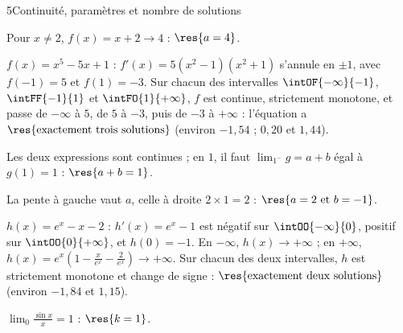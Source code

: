 \begin{corrige}{5}{Continuité, paramètres et nombre de solutions}
\begin{questions}
  \item Pour $x\neq2$, $f(x)=x+2\to4$ : $\res{a=4}$.
  \item $f(x)=x^{5}-5x+1$ : $f'(x)=5\left(x^{2}-1\right)\left(x^{2}+1\right)$ s'annule en $\pm1$, avec $f(-1)=5$ et $f(1)=-3$.
    Sur chacun des intervalles $\intOF{-\infty}{-1}$, $\intFF{-1}{1}$ et $\intFO{1}{+\infty}$, $f$ est continue, strictement
    monotone, et passe de $-\infty$ à $5$, de $5$ à $-3$, puis de $-3$ à $+\infty$ : l'équation a $\res{\text{exactement trois solutions}}$
    (environ $-1{,}54$ ; $0{,}20$ et $1{,}44$).
  \item \begin{questions}
      \item Les deux expressions sont continues ; en $1$, il faut $\lim_{1^{-}}g=a+b$ égal à $g(1)=1$ : $\res{a+b=1}$.
      \item La pente à gauche vaut $a$, celle à droite $2\times1=2$ : $\res{a=2\text{ et }b=-1}$.
    \end{questions}
  \item $h(x)=e^{x}-x-2$ : $h'(x)=e^{x}-1$ est négatif sur $\intOO{-\infty}{0}$, positif sur $\intOO{0}{+\infty}$, et
    $h(0)=-1$. En $-\infty$, $h(x)\to+\infty$ ; en $+\infty$, $h(x)=e^{x}\left(1-\frac{x}{e^{x}}-\frac{2}{e^{x}}\right)\to+\infty$.
    Sur chacun des deux intervalles, $h$ est strictement monotone et change de signe : $\res{\text{exactement deux solutions}}$
    (environ $-1{,}84$ et $1{,}15$).
  \item $\lim_{0}\frac{\sin x}{x}=1$ : $\res{k=1}$.
\end{questions}
\end{corrige}


